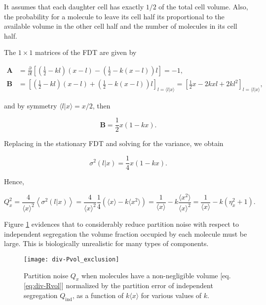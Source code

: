 It assumes that each daughter cell has exactly $1/2$ of the total cell volume. Also, the probability for a molecule to leave its cell half its proportional to the available volume in the other cell half and the number of molecules in its cell half.

The $1\times 1$ matrices of the FDT are given by

\begin{equation*}
  \begin{split}
  \mathbf{A}&=\frac{\partial}{\partial l}\left[\left(\frac{1}{2}-kl\right)\left(x-l\right)-\left(\frac{1}{2}-k\left(x-l\right)\right)l\right]=-1,\\
  \mathbf{B}&=\left[\left(\frac{1}{2}-kl\right)\left(x-l\right)+\left(\frac{1}{2}-k\left(x-l\right)\right)l\right]_{l=\langle l|x\rangle} = \left[\frac{1}{2}x-2kxl+2kl^2\right]_{l=\langle l|x\rangle},
  \end{split}
\end{equation*}

and by symmetry $\langle l|x\rangle = x/2$, then

\begin{equation*}
  \mathbf{B} = \frac{1}{2}x(1-kx).
\end{equation*}

Replacing in the stationary FDT and solving for the variance, we obtain

\begin{equation*}
  \sigma^2(l|x) = \frac{1}{4}x(1-kx).
\end{equation*}

Hence,

\begin{equation}
  \label{eq:div-Rvol}
  Q_x^2 = \frac{4}{\langle x\rangle^2}\left\langle \sigma^2(l|x)\right\rangle = \frac{4}{\langle x\rangle^2}\frac{1}{4}\left(\langle x\rangle-k\langle x^2\rangle\right) = \frac{1}{\langle x\rangle} - k\frac{\langle x^2\rangle}{\langle x\rangle^2} = \frac{1}{\langle x\rangle} - k(\eta_x^2+1).
\end{equation}

Figure \ref{fig:div-Pvol_exclusion} evidences that to considerably reduce partition noise with respect to independent segregation the volume fraction occupied by each molecule must be large. This is biologically unrealistic for many types of components.

\begin{figure}[H]
  \centering
  \texttt{[image: div-Pvol\_exclusion]}
  \caption[Partition noise when molecules have a non-negligible volume]{\label{fig:div-Pvol_exclusion}Partition noise $Q_x$ when molecules have a non-negligible volume [eq. \eqref{eq:div-Rvol}] normalized by the partition error of independent segregation $Q_\text{ind}$, as a function of $k\langle x\rangle$ for various values of $k$.}
\end{figure}

